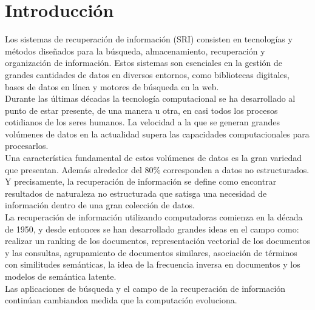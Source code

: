 \chapter*{Introducción}\label{chapter:introduction}

Los sistemas de recuperación de información (SRI) consisten en tecnologías y métodos diseñados para 
la búsqueda, almacenamiento, recuperación y organización de información. Estos sistemas son esenciales en la 
gestión de grandes cantidades de datos en diversos entornos, como bibliotecas digitales, bases de datos en 
línea y motores de búsqueda en la web.\\ %
Durante las últimas décadas la tecnología computacional se ha desarrollado al punto de 
estar presente, de una manera u otra, en casi todos los procesos cotidianos de los seres humanos.
La velocidad a la que se generan grandes volúmenes de datos en la actualidad supera las capacidades 
computacionales para procesarlos.\\
Una característica fundamental de estos volúmenes de datos es la gran variedad que presentan. Además 
alrededor del 80$\%$ corresponden a datos no estructurados. Y precisamente, la recuperación de información 
se define como encontrar resultados de naturaleza no estructurada que satisga una necesidad de información 
dentro de una gran colección de datos\cite{manning2008introductiontoIR}.\\
La recuperación de información utilizando computadoras comienza en la década de 1950, y desde entonces se 
han desarrollado grandes ideas en el campo como: realizar un ranking de los documentos, representación 
vectorial de los documentos y las consultas, agrupamiento de documentos similares, asociación de términos 
con similitudes semánticas, la idea de la frecuencia inversa en documentos y los modelos de semántica latente.\\
Las aplicaciones de búsqueda y el campo de la recuperación de información continúan cambiandoa medida que la computación evoluciona.




